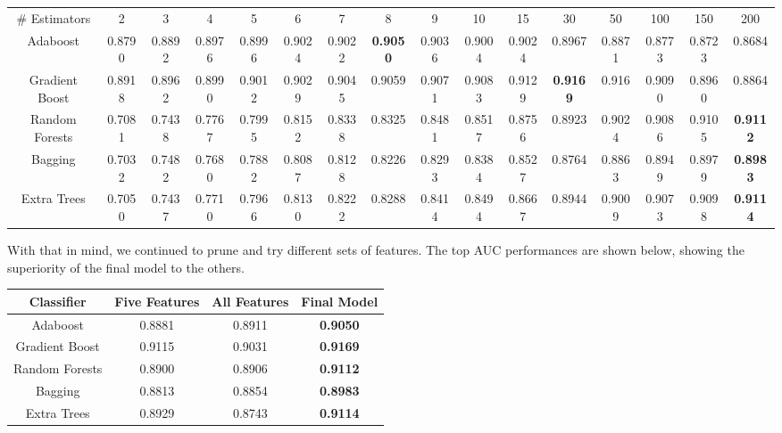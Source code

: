 \documentclass{article} %
\begin{document}
\begin{adjustbox}{width=\textwidth,totalheight=\textheight,keepaspectratio}
\begin{tabular}{c | c c c c c c c c c c c c c c c}
\# Estimators & 2 & 3 & 4 & 5 & 6 & 7 & 8 & 9 & 10 & 15 & 30 & 50 & 100 & 150 & 200\\
Adaboost & 0.8790 & 0.8892 & 0.8976 & 0.8996 & 0.9024 & 0.9022 & \textbf{0.9050} & 0.9036 & 0.9004 & 0.9024 & 0.8967 & 0.8871 & 0.8773 & 0.8723 & 0.8684\\
\hline
Gradient Boost & 0.8918 & 0.8962 & 0.8990 & 0.9012 & 0.9029 & 0.9045 & 0.9059 & 0.9071 & 0.9083 & 0.9129 & \textbf{0.9169} & 0.916 & 0.9090 & 0.8960 & 0.8864\\
Random Forests & 0.7081 & 0.7438 & 0.7767 & 0.7995 & 0.8152 & 0.8338 & 0.8325 & 0.8481 & 0.8517 & 0.8756 & 0.8923 & 0.9024 & 0.9086 & 0.9105 & \textbf{0.9112}\\
Bagging & 0.7032 & 0.7482 & 0.7680 & 0.7882 & 0.8087 & 0.8128 & 0.8226 & 0.8293 & 0.8384 & 0.8527 & 0.8764 & 0.8863 & 0.8949 & 0.8979 & \textbf{0.8983}\\
Extra Trees & 0.7050 & 0.7437 & 0.7710 & 0.7966 & 0.8130 & 0.8222 & 0.8288 & 0.8414 & 0.8494 & 0.8667 & 0.8944 & 0.9009 & 0.9073 & 0.9098 & \textbf{0.9114}
\end{tabular}
\end{adjustbox}

With that in mind, we continued to prune and try different sets of features. The
top AUC performances are shown below, showing the superiority of the final model
to the others.

\begin{tabular}{c|ccc}
Classifier & Five Features & All Features & Final Model\\
\hline
Adaboost & 0.8881 & 0.8911 & \textbf{0.9050}\\
Gradient Boost & 0.9115 & 0.9031 & \textbf{0.9169}\\
Random Forests & 0.8900 & 0.8906 & \textbf{0.9112}\\
Bagging & 0.8813 & 0.8854 & \textbf{0.8983}\\
Extra Trees & 0.8929 & 0.8743 & \textbf{0.9114}
\end{tabular}

\clearpage
\end{document}

